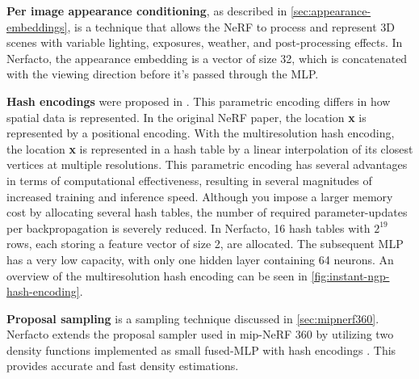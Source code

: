 \textbf{Per image appearance conditioning}, as described in \autoref{sec:appearance-embeddings}, is a technique that allows the NeRF to process and represent 3D scenes with variable lighting, exposures, weather, and post-processing effects. In Nerfacto, the appearance embedding is a vector of size 32, which is concatenated with the viewing direction before it's passed through the MLP.

\textbf{Hash encodings} were proposed in \cite{muller_instant_2022}. This parametric encoding differs in how spatial data is represented. In the original NeRF paper, the location \textbf{x} is represented by a positional encoding. With the multiresolution hash encoding, the location \textbf{x} is represented in a hash table by a linear interpolation of its closest vertices at multiple resolutions. This parametric encoding has several advantages in terms of computational effectiveness, resulting in several magnitudes of increased training and inference speed. Although you impose a larger memory cost by allocating several hash tables, the number of required parameter-updates per backpropagation is severely reduced. In Nerfacto, 16 hash tables with $2^{19}$ rows, each storing a feature vector of size 2, are allocated. The subsequent MLP has a very low capacity, with only one hidden layer containing 64 neurons. An overview of the multiresolution hash encoding can be seen in \autoref{fig:instant-ngp-hash-encoding}.




\textbf{Proposal sampling} is a sampling technique discussed in \autoref{sec:mipnerf360}. Nerfacto extends the proposal sampler used in mip-NeRF 360 by utilizing two density functions implemented as small fused-MLP with hash encodings \cite{muller_instant_2022}. This provides accurate and fast density estimations.

